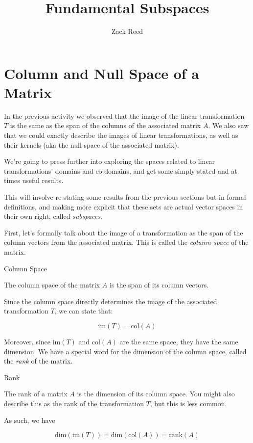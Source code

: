 \documentclass{ximera}
\author{Zack Reed}
\title{Fundamental Subspaces}\license{CC BY-NC-SA 4.0}
\begin{document}
\begin{abstract}

\end{abstract}
\maketitle

\section*{Column and Null Space of a Matrix}

In the previous activity we observed that the image of the linear transformation $T$ is the same as the span of the columns of the associated matrix $A$. We also saw that we could exactly describe the images of linear transformations, as well as their kernels (aka the null space of the associated matrix).

We're going to press further into exploring the spaces related to linear transformations' domains and co-domains, and get some simply stated and at times useful results.

This will involve re-stating some results from the previous sections but in formal definitions, and making more explicit that these sets are actual vector spaces in their own right, called \emph{subspaces}.

First, let's formally talk about the image of a transformation as the span of the column vectors from the associated matrix. This is called the \emph{column space} of the matrix.

\begin{definition}{Column Space}

The column space of the matrix $A$ is the span of its column vectors.

Since the column space directly determines the image of the associated transformation $T$, we can state that:

$$\mbox{im}(T)=\mbox{col}(A)$$
\end{definition}

Moreover, since $\mbox{im}(T)$ and $\mbox{col}(A)$ are the same space, they have the same dimension. We have a special word for the dimension of the column space, called the \emph{rank} of the matrix. 

\begin{definition}{Rank}

  The rank of a matrix $A$ is the dimension of its column space. You might also describe this as the rank of the transformation $T$, but this is less common. 

  As such, we have

$$\mbox{dim}(\mbox{im}(T))=\mbox{dim}(\mbox{col}(A))=\mbox{rank}(A)$$
\end{definition}
 
\end{document}

